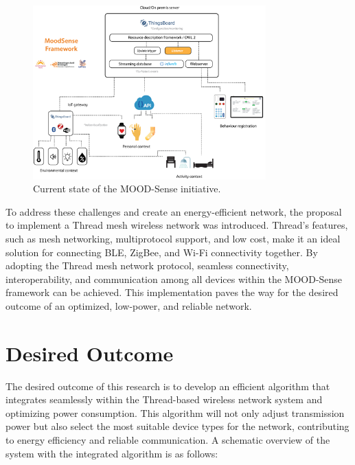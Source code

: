 \begin{figure}[H]
    \centering
    \includegraphics[width=0.8\textwidth]{images/rationale/rationale_present_situation.png}
    \caption{Current state of the MOOD-Sense initiative.}
    \label{fig:rationale_present_situation}
\end{figure}

To address these challenges and create an energy-efficient network, the proposal to implement a Thread mesh wireless network was introduced. Thread's features, such as mesh networking, multiprotocol support, and low cost, make it an ideal solution for connecting BLE, ZigBee, and Wi-Fi connectivity together. By adopting the Thread mesh network protocol, seamless connectivity, interoperability, and communication among all devices within the MOOD-Sense framework can be achieved. This implementation paves the way for the desired outcome of an optimized, low-power, and reliable network.


\section{Desired Outcome}\label{sec:desired_outcome}
The desired outcome of this research is to develop an efficient algorithm that integrates seamlessly within the Thread-based wireless network system and optimizing power consumption. This algorithm will not only adjust transmission power but also select the most suitable device types for the network, contributing to energy efficiency and reliable communication. A schematic overview of the system with the integrated algorithm is as follows:

